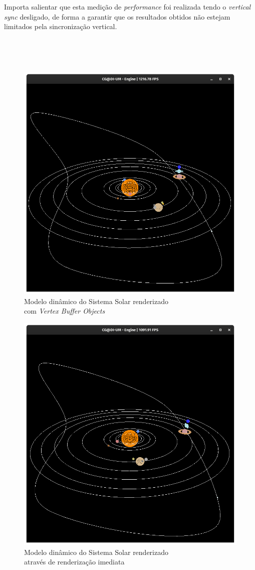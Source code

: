 \documentclass[a4paper, 11pt]{article}
\begin{document}
Importa salientar que esta medição de \textit{performance} foi realizada tendo o \textit{vertical 
sync} desligado, de forma a garantir que os resultados obtidos não estejam limitados pela 
sincronização vertical.

\

\

\begin{figure}[H]
    \centering
    \includegraphics[width=.6\textwidth]{img/fps_comvbo.png}
    \caption{Modelo dinâmico do Sistema Solar renderizado \\ com \textit{Vertex Buffer Objects}}
\end{figure}

\begin{figure}[H]
    \centering
    \includegraphics[width=.6\textwidth]{img/fps_semvbo.png}
    \caption{Modelo dinâmico do Sistema Solar renderizado \\
    através de renderização imediata}
\end{figure}
\end{document}
